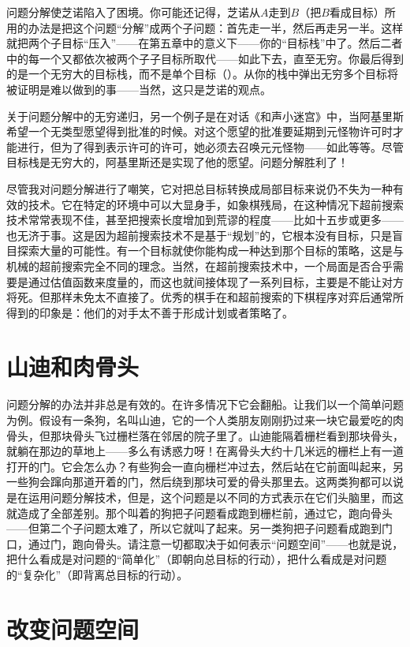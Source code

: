 问题分解使芝诺陷入了困境。你可能还记得，芝诺从$A$走到$B$（把$B$看成目标）所用的办法是把这个问题“分解”成两个子问题：首先走一半，然后再走另一半。这样就把两个子目标“压入”——在第五章中的意义下——你的“目标栈”中了。然后二者中的每一个又都依次被两个子子目标所取代——如此下去，直至无穷。你最后得到的是一个无穷大的目标栈，而不是单个目标（）。从你的栈中弹出无穷多个目标将被证明是难以做到的事——当然，这只是芝诺的观点。

关于问题分解中的无穷递归，另一个例子是在对话《和声小迷宫》中，当阿基里斯希望一个无类型愿望得到批准的时候。对这个愿望的批准要延期到元怪物许可时才能进行，但为了得到表示许可的许可，她必须去召唤元元怪物——如此等等。尽管目标栈是无穷大的，阿基里斯还是实现了他的愿望。问题分解胜利了！

尽管我对问题分解进行了嘲笑，它对把总目标转换成局部目标来说仍不失为一种有效的技术。它在特定的环境中可以大显身手，如象棋残局，在这种情况下超前搜索技术常常表现不佳，甚至把搜索长度增加到荒谬的程度——比如十五步或更多——也无济于事。这是因为超前搜索技术不是基于“规划”的，它根本没有目标，只是盲目探索大量的可能性。有一个目标就使你能构成一种达到那个目标的策略，这是与机械的超前搜索完全不同的理念。当然，在超前搜索技术中，一个局面是否合乎需要是通过估值函数来度量的，而这也就间接体现了一系列目标，主要是不能让对方将死。但那样未免太不直接了。优秀的棋手在和超前搜索的下棋程序对弈后通常所得到的印象是：他们的对手太不善于形成计划或者策略了。

\section{山迪和肉骨头}

问题分解的办法并非总是有效的。在许多情况下它会翻船。让我们以一个简单问题为例。假设有一条狗，名叫山迪，它的一个人类朋友刚刚扔过来一块它最爱吃的肉骨头，但那块骨头飞过栅栏落在邻居的院子里了。山迪能隔着栅栏看到那块骨头，就躺在那边的草地上——多么有诱惑力呀！在离骨头大约十几米远的栅栏上有一道打开的门。它会怎么办？有些狗会一直向栅栏冲过去，然后站在它前面叫起来，另一些狗会蹿向那道开着的门，然后绕到那块可爱的骨头那里去。这两类狗都可以说是在运用问题分解技术，但是，这个问题是以不同的方式表示在它们头脑里，而这就造成了全部差别。那个叫着的狗把子问题看成跑到栅栏前，通过它，跑向骨头——但第二个子问题太难了，所以它就叫了起来。另一类狗把子问题看成跑到门口，通过门，跑向骨头。请注意一切都取决于如何表示“问题空间”——也就是说，把什么看成是对问题的“简单化”（即朝向总目标的行动），把什么看成是对问题的“复杂化”（即背离总目标的行动）。

\section{改变问题空间}

